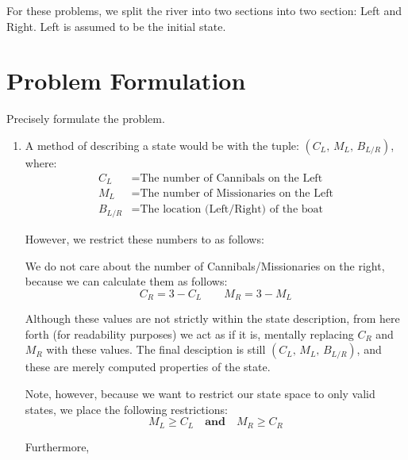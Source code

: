 \documentclass[12pt]{scrartcl}
\newcommand{\statedescript}{\left(C_L,\, M_L,\, B_{L/R}\right)}
\begin{document}
\maketitle

For these problems, we split the river into two sections into two section: Left and Right. Left is assumed to be the initial state.

\section{Problem Formulation}
\begin{statement}
    Precisely formulate the problem.
\end{statement}

\begin{enumerate}
    \item A method of describing a state would be with the tuple: $\statedescript$, where:
        \begin{align*}
            C_L     &= \text{The number of Cannibals on the Left} \\
            M_L     &= \text{The number of Missionaries on the Left} \\
            B_{L/R} &= \text{The location (Left/Right) of the boat}
        \end{align*}

        However, we restrict these numbers to as follows:

        We do not care about the number of Cannibals/Missionaries on the right, because we can calculate them as follows:
        \begin{equation*}
            C_R = 3 - C_L \qquad M_R = 3 - M_L
        \end{equation*}

        Although these values are not strictly within the state description, from here forth (for readability purposes) we act as if it is, mentally replacing $C_R$ and $M_R$ with these values. The final desciption is still $\statedescript$, and these are merely computed properties of the state.

        Note, however, because we want to restrict our state space to only valid states, we place the following restrictions:
        \begin{equation*}
            M_L \geq C_L \quad\textbf{and}\quad M_R \geq C_R
        \end{equation*}

        Furthermore,


\end{enumerate}
\end{document}
